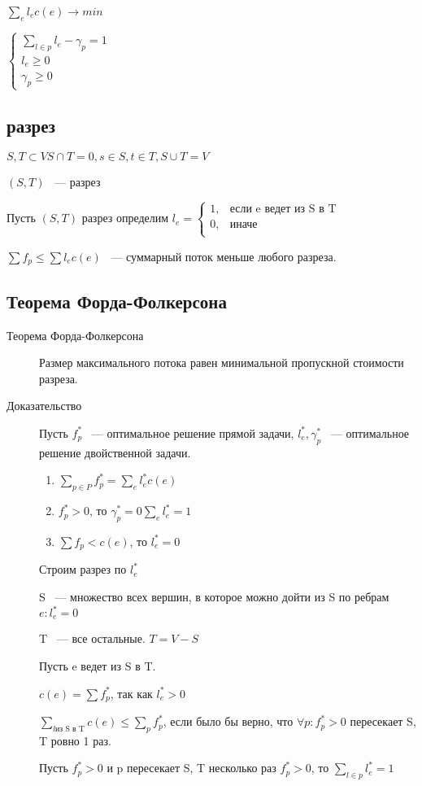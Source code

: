 \documentclass[12pt]{article}
\begin{document}
$\sum_e l_e c(e) \to min$

$\begin{cases} \sum_{l \in p}l_e - \gamma_p = 1\\ l_e \ge 0 \\ \gamma_p \ge 0\end{cases}$

\subsection{разрез}

$S, T \subset V S\cap T = 0, s \in S, t \in T, S \cup T = V$

$(S, T)$ ~--- разрез

Пусть $(S, T)$ разрез определим $l_e = \begin{cases} 1, &\text{если e ведет из S в T}\\ 0, &\text{иначе}\\ \end{cases}$

$\sum f_p \le \sum l_e c(e)$ ~--- суммарный поток меньше любого разреза.

\subsection{Теорема Форда-Фолкерсона}

\begin{description}
\item[Теорема Форда-Фолкерсона] Размер максимального потока равен минимальной пропускной стоимости разреза.

\item[Доказательство] Пусть $f_p^*$ ~--- оптимальное решение прямой задачи, $l_e^*, \gamma_p^*$ ~--- оптимальное решение двойственной задачи. 

\begin{enumerate}

\item $\sum_{p \in P}f^*_p = \sum_e l_e^* c(e)$
\item $f_p^* >0$, то $\gamma_p^* = 0 \sum_e l_e^* = 1$

\item $\sum f_p < c(e)$, то $l^*_e = 0$
\end{enumerate}

Строим разрез по $l^*_e$

S ~--- множество всех вершин, в которое можно дойти из S по ребрам $e: l^*_e = 0$

T ~--- все остальные. $T = V - S$

Пусть e ведет из S в T.

$c(e) = \sum f^*_p$, так как $l^*_e > 0$

$\sum_{l \text{из S в T}}c(e) \le \sum_{p} f^*_p$, если было бы верно, что $\forall p: f^*_p > 0$ пересекает S, T ровно 1 раз.

Пусть $f_p^* > 0$ и p пересекает S, T несколько раз $f_p^* > 0$, то $\sum_{l \in p}l_e^* = 1$

\end{description}
\end{document}
